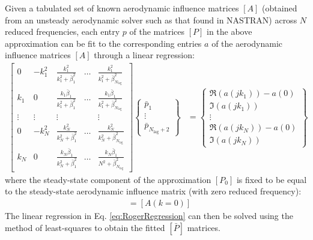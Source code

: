 Given a tabulated set of known aerodynamic influence matrices $[A]$ (obtained from an unsteady aerodynamic solver such as that found in NASTRAN) across $N$ reduced frequencies, each entry $p$ of the matrices $[P]$ in the above approximation can be fit to the corresponding entries $a$ of the aerodynamic influence matrices $[A]$ through a linear regression:
\begin{align}
	\label{eq:RogerRegression}
    \begin{bmatrix}
        0 & -k_1^2 & \frac{k_1^2}{k_1^2 + \bar{\beta}_1^2} & \dots & \frac{k_1^2}{k_1^2 + \bar{\beta}_{N_\text{lag}}^2} \\
	    k_1 & 0 & \frac{k_1 \bar{\beta}_1}{k_1^2 + \bar{\beta}_1^2} & \dots & \frac{k_1 \bar{\beta}_1}{k_1^2 + \bar{\beta}_{N_\text{lag}}^2} \\
	    \vdots & \vdots & \vdots & & \vdots \\
        0 & -k_N^2 & \frac{k_N^2}{k_N^2 + \bar{\beta}_1^2} & \dots & \frac{k_N^2}{k_N^2 + \bar{\beta}_{N_\text{lag}}^2} \\
	    k_N & 0 & \frac{k_N \bar{\beta}_1}{k_N^2 + \bar{\beta}_1^2} & \dots & \frac{k_N \bar{\beta}_1}{N^2 + \bar{\beta}_{N_\text{lag}}^2}	    
    \end{bmatrix}
    \begin{Bmatrix} \bar{p}_1 \\ \vdots \\ \bar{p}_{N_\text{lag}+2} \end{Bmatrix}
    &=
    \begin{Bmatrix}
	    \Re(a(jk_1)) - a(0) \\
	    \Im(a(jk_1)) \\
	    \vdots \\
	    \Re(a(jk_N)) - a(0) \\
	    \Im(a(jk_N))	    
    \end{Bmatrix}
\end{align}
where the steady-state component of the approximation $[P_0]$ is fixed to be equal to the steady-state aerodynamic influence matrix (with zero reduced frequency):
\begin{align}
    [\bar{P}_0] &= [A(k=0)]
\end{align}
The linear regression in Eq. \ref{eq:RogerRegression} can then be solved using the method of least-squares to obtain the fitted $[\bar{P}]$ matrices.


